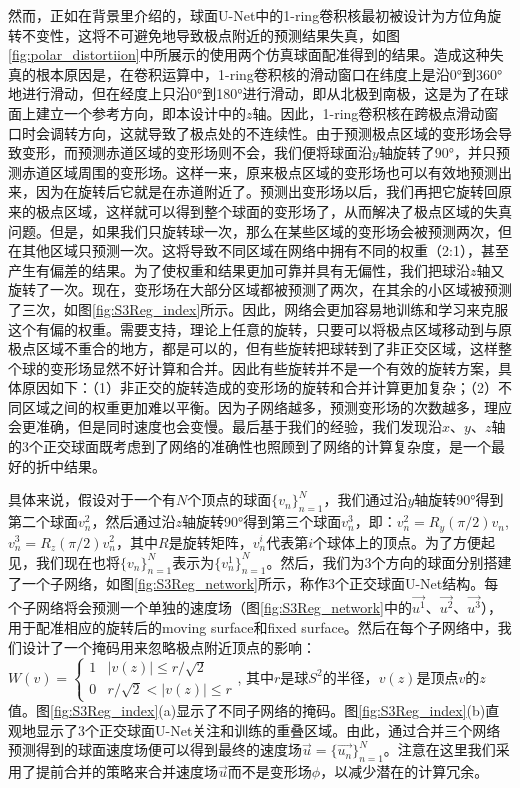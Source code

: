 然而，正如在背景里介绍的，球面U-Net中的1-ring卷积核最初被设计为方位角旋转不变性，这将不可避免地导致极点附近的预测结果失真，如图\ref{fig:polar_distortiion}中所展示的使用两个仿真球面配准得到的结果。造成这种失真的根本原因是，在卷积运算中，1-ring卷积核的滑动窗口在纬度上是沿0°到360°地进行滑动，但在经度上只沿0°到180°进行滑动，即从北极到南极，这是为了在球面上建立一个参考方向，即本设计中的$z$轴。因此，1-ring卷积核在跨极点滑动窗口时会调转方向，这就导致了极点处的不连续性。由于预测极点区域的变形场会导致变形，而预测赤道区域的变形场则不会，我们便将球面沿$y$轴旋转了90°，并只预测赤道区域周围的变形场。这样一来，原来极点区域的变形场也可以有效地预测出来，因为在旋转后它就是在赤道附近了。预测出变形场以后，我们再把它旋转回原来的极点区域，这样就可以得到整个球面的变形场了，从而解决了极点区域的失真问题。但是，如果我们只旋转球一次，那么在某些区域的变形场会被预测两次，但在其他区域只预测一次。这将导致不同区域在网络中拥有不同的权重（2:1），甚至产生有偏差的结果。为了使权重和结果更加可靠并具有无偏性，我们把球沿$z$轴又旋转了一次。现在，变形场在大部分区域都被预测了两次，在其余的小区域被预测了三次，如图\ref{fig:S3Reg_index}所示。因此，网络会更加容易地训练和学习来克服这个有偏的权重。需要支持，理论上任意的旋转，只要可以将极点区域移动到与原极点区域不重合的地方，都是可以的，但有些旋转把球转到了非正交区域，这样整个球的变形场显然不好计算和合并。因此有些旋转并不是一个有效的旋转方案，具体原因如下：（1）非正交的旋转造成的变形场的旋转和合并计算更加复杂；（2）不同区域之间的权重更加难以平衡。因为子网络越多，预测变形场的次数越多，理应会更准确，但是同时速度也会变慢。最后基于我们的经验，我们发现沿$x$、$y$、$z$轴的3个正交球面既考虑到了网络的准确性也照顾到了网络的计算复杂度，是一个最好的折中结果。

具体来说，假设对于一个有$N$个顶点的球面${\{v_n\}}_{n=1}^N$，我们通过沿$y$轴旋转\ang{90}得到第二个球面${v_n^2}$，然后通过沿$z$轴旋转\ang{90}得到第三个球面${v_n^3}$，即：$v_n^2=R_y(\pi/2)v_n$, $v_n^3=R_z(\pi/2)v_n^2$，其中$R$是旋转矩阵，${v_n^i}$代表第$i$个球体上的顶点。为了方便起见，我们现在也将${\{v_n\}}_{n=1}^N$表示为${\{v_n^1\}}_{n=1}^N$。然后，我们为3个方向的球面分别搭建了一个子网络，如图\ref{fig:S3Reg_network}所示，称作3个正交球面U-Net结构。每个子网络将会预测一个单独的速度场（图\ref{fig:S3Reg_network}中的$\overrightarrow{u^1}$、$\overrightarrow{u^2}$、$\overrightarrow{u^3}$），用于配准相应的旋转后的moving surface和fixed surface。然后在每个子网络中，我们设计了一个掩码用来忽略极点附近顶点的影响：$
	W(v)=\begin{cases} 
	1 & |v(z)| \leq r/\sqrt{2} \\
	0 & r/\sqrt{2} < |v(z)| \leq r  
	\end{cases}
	$, 其中$r$是球$S^2$的半径，$v(z)$是顶点$v$的$z$值。图\ref{fig:S3Reg_index}(a)显示了不同子网络的掩码。图\ref{fig:S3Reg_index}(b)直观地显示了3个正交球面U-Net关注和训练的重叠区域。由此，通过合并三个网络预测得到的球面速度场便可以得到最终的速度场$\overrightarrow{u}=\{\overrightarrow{u_n}\}_{n=1}^N$。注意在这里我们采用了提前合并的策略来合并速度场$\overrightarrow{u}$而不是变形场$\phi$，以减少潜在的计算冗余。

